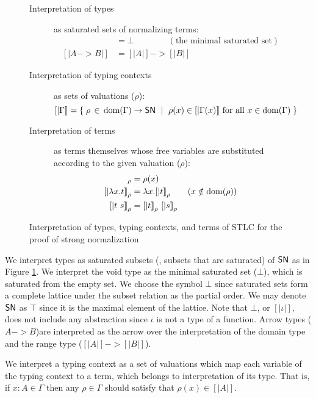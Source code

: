 \begin{figure}
\begin{singlespace}
\begin{description}
\item[Interpretation of types] as saturated sets of normalizing terms:
\begin{align*}
[| \iota  |] &= \bot \qquad\qquad (\text{the minimal saturated set}) \\
[| A -> B |] &= [| A |] -> [| B |]
\end{align*}

\item[Interpretation of typing contexts] as sets of valuations ($\rho$):
\[ [| \Gamma |] =
	\{\; \rho\,\in\,\mathop{\mathrm{dom}}(\Gamma) -> \mathsf{SN} ~\mid~
             \rho(x) \in [|\Gamma(x)|] ~\text{for all}~x\in\mathop{\mathrm{dom}}(\Gamma) \;\}
\]

\item[Interpretation of terms] as terms themselves whose free variables are
	substituted according to the given valuation ($\rho$):
\begin{align*}
[|x|]_\rho      &= \rho(x) \\
[|\l x.t|]_\rho &= \l x.[|t|]_\rho  \qquad (x\notin\dom(\rho)) \\
[|t~s|]_\rho    &= [|t|]_\rho~[|s|]_\rho
\end{align*}
\end{description}
\caption[Interpretation of STLC for proving strong normalization]
	{Interpretation of types, typing contexts, and terms of STLC
         for the proof of strong normalization}
\label{fig:interpSTLC}
\end{singlespace}
\end{figure}

We interpret types as saturated subsets (\ie, subsets that are saturated) of
$\mathsf{SN}$ as in Figure \ref{fig:interpSTLC}. We interpret the void type as
the minimal saturated set ($\bot$), which is saturated from the empty set.
We choose the symbol $\bot$ since saturated sets form a complete lattice
under the subset relation as the partial order. We may denote $\mathsf{SN}$ as $\top$
since it is the maximal element of the lattice. Note that $\bot$,
or $[|\iota|]$, does not include any abstraction since $\iota$ is not
a type of a function. Arrow types ($A -> B$)are interpreted as the arrow over
the interpretation of the domain type and the range type ($[|A|] -> [|B|]$).

We interpret a typing context as a set of valuations which map
each variable of the typing context to a term, which belongs to interpretation
of its type. That is, if $x : A \in \Gamma$ then any $\rho \in \Gamma$ should
satisfy that $\rho(x) \in [|A|]$.

